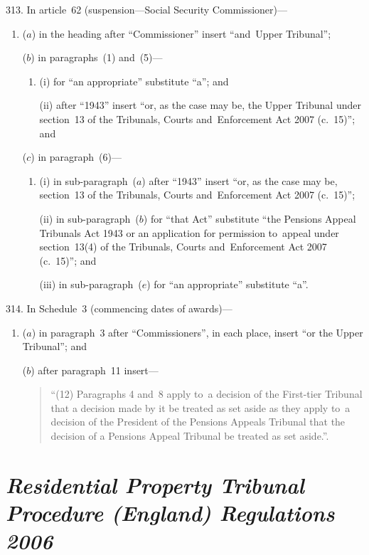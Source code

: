 \documentclass[12pt,a4paper]{article}
\begin{document}
313.  In article~62 (suspension---Social Security Commissioner)—
\begin{enumerate}\item[]
($a$) in the heading after “Commissioner” insert “and~Upper Tribunal”;

($b$) in paragraphs~(1) and~(5)—
\begin{enumerate}\item[]
(i) for “an appropriate” substitute “a”; and

(ii) after “1943” insert “or, as the case may be, the Upper Tribunal under section~13 of the Tribunals, Courts and~Enforcement Act 2007 (c.~15)”; and
\end{enumerate}

($c$) in paragraph~(6)—
\begin{enumerate}\item[]
(i) in sub-paragraph~($a$)  after “1943” insert “or, as the case may be, section~13 of the Tribunals, Courts and~Enforcement Act 2007 (c.~15)”;

(ii) in sub-paragraph~($b$)  for “that Act” substitute “the Pensions Appeal Tribunals Act 1943 or an application for permission to~appeal under section~13(4) of the Tribunals, Courts and~Enforcement Act 2007 (c.~15)”; and

(iii) in sub-paragraph~($e$)  for “an appropriate” substitute “a”.
\end{enumerate}
\end{enumerate}

\medskip

314.  In Schedule~3 (commencing dates of awards)—
\begin{enumerate}\item[]
($a$) in paragraph~3 after “Commissioners”, in each place, insert “or the Upper Tribunal”; and

($b$) after paragraph~11 insert—
\begin{quotation}
“(12) Paragraphs 4 and~8 apply to~a decision of the First-tier Tribunal that a decision made by it be treated as set aside as they apply to~a decision of the President of the Pensions Appeals Tribunal that the decision of a Pensions Appeal Tribunal be treated as set aside.”.
\end{quotation}
\end{enumerate}

\section*{\itshape\sloppy{} Residential Property Tribunal Procedure (England) Regulations 2006}
\end{document}
